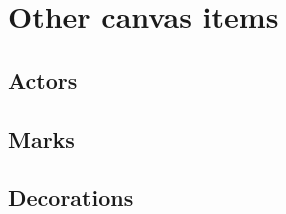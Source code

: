 \section{Other canvas items}


\subsection{Actors}

\subsection{Marks}

\subsection{Decorations}
  


